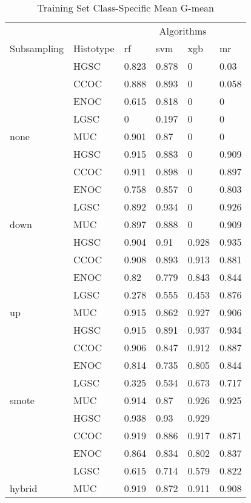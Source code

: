 \documentclass[
]{report}
\begin{document}
\begin{table}

\caption{\label{tab:train-gmean-class-table}Training Set Class-Specific Mean G-mean}
\centering
\begin{tabular}[t]{l|l|l|l|l|l}
\hline
\multicolumn{2}{c|}{ } & \multicolumn{4}{c}{Algorithms} \\
\cline{3-6}
Subsampling & Histotype & rf & svm & xgb & mr\\
\hline
 & HGSC & 0.823 & 0.878 & 0 & 0.03\\
\cline{2-6}
 & CCOC & 0.888 & 0.893 & 0 & 0.058\\
\cline{2-6}
 & ENOC & 0.615 & 0.818 & 0 & 0\\
\cline{2-6}
 & LGSC & 0 & 0.197 & 0 & 0\\
\cline{2-6}
\multirow{-5}{*}{\raggedright\arraybackslash none} & MUC & 0.901 & 0.87 & 0 & 0\\
\cline{1-6}
 & HGSC & 0.915 & 0.883 & 0 & 0.909\\
\cline{2-6}
 & CCOC & 0.911 & 0.898 & 0 & 0.897\\
\cline{2-6}
 & ENOC & 0.758 & 0.857 & 0 & 0.803\\
\cline{2-6}
 & LGSC & 0.892 & 0.934 & 0 & 0.926\\
\cline{2-6}
\multirow{-5}{*}{\raggedright\arraybackslash down} & MUC & 0.897 & 0.888 & 0 & 0.909\\
\cline{1-6}
 & HGSC & 0.904 & 0.91 & 0.928 & 0.935\\
\cline{2-6}
 & CCOC & 0.908 & 0.893 & 0.913 & 0.881\\
\cline{2-6}
 & ENOC & 0.82 & 0.779 & 0.843 & 0.844\\
\cline{2-6}
 & LGSC & 0.278 & 0.555 & 0.453 & 0.876\\
\cline{2-6}
\multirow{-5}{*}{\raggedright\arraybackslash up} & MUC & 0.915 & 0.862 & 0.927 & 0.906\\
\cline{1-6}
 & HGSC & 0.915 & 0.891 & 0.937 & 0.934\\
\cline{2-6}
 & CCOC & 0.906 & 0.847 & 0.912 & 0.887\\
\cline{2-6}
 & ENOC & 0.814 & 0.735 & 0.805 & 0.844\\
\cline{2-6}
 & LGSC & 0.325 & 0.534 & 0.673 & 0.717\\
\cline{2-6}
\multirow{-5}{*}{\raggedright\arraybackslash smote} & MUC & 0.914 & 0.87 & 0.926 & 0.925\\
\cline{1-6}
 & HGSC & 0.938 & 0.93 & 0.929 & \cellcolor[HTML]{90ee90}{0.941}\\
\cline{2-6}
 & CCOC & 0.919 & 0.886 & 0.917 & 0.871\\
\cline{2-6}
 & ENOC & 0.864 & 0.834 & 0.802 & 0.837\\
\cline{2-6}
 & LGSC & 0.615 & 0.714 & 0.579 & 0.822\\
\cline{2-6}
\multirow{-5}{*}{\raggedright\arraybackslash hybrid} & MUC & 0.919 & 0.872 & 0.911 & 0.908\\
\hline
\end{tabular}
\end{table}
\end{document}

